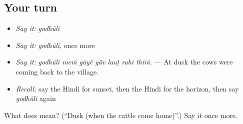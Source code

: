\subsection*{Your turn}
\begin{itemize}
\raggedright
  \item \emph{Say it:} \emph{godhūli}
  \item \emph{Say it:} \emph{godhūli}, once more
  \item \emph{Say it:} \emph{godhūli meṁ gāyẽ gā̃v lauṭ rahī thīṁ.} — At dusk the cows were coming back to the village.
  \item \emph{Recall:} say the Hindi for sunset, then the Hindi for the horizon, then say \emph{godhūli} again
\end{itemize}

\begin{tcolorbox}[breakable,colback=teal!4,colframe=teal!35!black,title={Before you move on}]
What does  mean? (\textquotedblleft{}Dusk (when the cattle come home)\textquotedblright{}.) Say it once more.
\end{tcolorbox}
